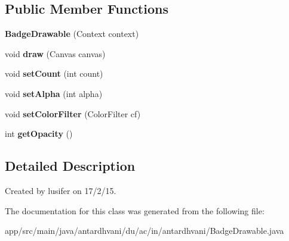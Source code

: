 \subsection*{Public Member Functions}
\begin{DoxyCompactItemize}
\item 
\hypertarget{classantardhvani_1_1du_1_1ac_1_1in_1_1antardhvani_1_1_badge_drawable_aef204ab8ced7148ac84ca96c3ed14d6e}{}{\bfseries Badge\+Drawable} (Context context)\label{classantardhvani_1_1du_1_1ac_1_1in_1_1antardhvani_1_1_badge_drawable_aef204ab8ced7148ac84ca96c3ed14d6e}

\item 
\hypertarget{classantardhvani_1_1du_1_1ac_1_1in_1_1antardhvani_1_1_badge_drawable_aca9c9ee398fb01c8ac558d15b7fd10b2}{}void {\bfseries draw} (Canvas canvas)\label{classantardhvani_1_1du_1_1ac_1_1in_1_1antardhvani_1_1_badge_drawable_aca9c9ee398fb01c8ac558d15b7fd10b2}

\item 
\hypertarget{classantardhvani_1_1du_1_1ac_1_1in_1_1antardhvani_1_1_badge_drawable_adbc7fcecb9d330ceef196e5d9df36b05}{}void {\bfseries set\+Count} (int count)\label{classantardhvani_1_1du_1_1ac_1_1in_1_1antardhvani_1_1_badge_drawable_adbc7fcecb9d330ceef196e5d9df36b05}

\item 
\hypertarget{classantardhvani_1_1du_1_1ac_1_1in_1_1antardhvani_1_1_badge_drawable_a83b0c6db73a77da5b8073496b1e22804}{}void {\bfseries set\+Alpha} (int alpha)\label{classantardhvani_1_1du_1_1ac_1_1in_1_1antardhvani_1_1_badge_drawable_a83b0c6db73a77da5b8073496b1e22804}

\item 
\hypertarget{classantardhvani_1_1du_1_1ac_1_1in_1_1antardhvani_1_1_badge_drawable_a7c58accc8b118a5952dea7a546317f9b}{}void {\bfseries set\+Color\+Filter} (Color\+Filter cf)\label{classantardhvani_1_1du_1_1ac_1_1in_1_1antardhvani_1_1_badge_drawable_a7c58accc8b118a5952dea7a546317f9b}

\item 
\hypertarget{classantardhvani_1_1du_1_1ac_1_1in_1_1antardhvani_1_1_badge_drawable_a8074138ee4fb46480630a842a0c1e7c8}{}int {\bfseries get\+Opacity} ()\label{classantardhvani_1_1du_1_1ac_1_1in_1_1antardhvani_1_1_badge_drawable_a8074138ee4fb46480630a842a0c1e7c8}

\end{DoxyCompactItemize}


\subsection{Detailed Description}
Created by lusifer on 17/2/15. 

The documentation for this class was generated from the following file\+:\begin{DoxyCompactItemize}
\item 
app/src/main/java/antardhvani/du/ac/in/antardhvani/Badge\+Drawable.\+java\end{DoxyCompactItemize}
